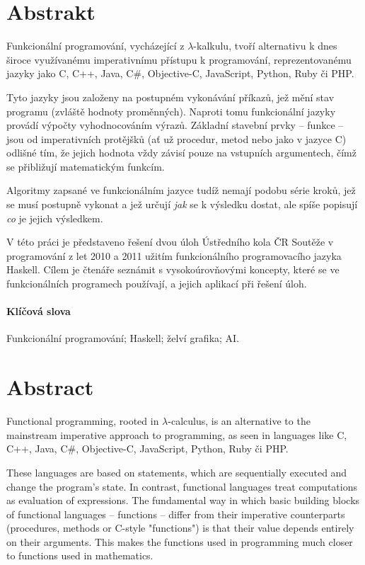 \begin{adjustwidth}{1.5cm}{1.5cm}

\section*{Abstrakt}

Funkcionální programování, vycházející z $\lambda$-kalkulu, tvoří alternativu k
dnes široce využívanému imperativnímu přístupu k programování, reprezentovanému
jazyky jako C, C++, Java, C\#, Objective-C, JavaScript, Python, Ruby či PHP.

Tyto jazyky jsou založeny na postupném vykonávání příkazů, jež mění stav
programu (zvláště hodnoty proměnných). Naproti tomu funkcionální jazyky provádí
výpočty vyhodnocováním výrazů. Základní stavební prvky -- funkce -- jsou od
imperativních protějšků (ať už procedur, metod nebo  jako v jazyce C)
odlišné tím, že jejich hodnota vždy závisí pouze na vstupních argumentech, čímž
se přibližují matematickým funkcím.

Algoritmy zapsané ve funkcionálním jazyce tudíž nemají podobu série kroků, jež
se musí postupně vykonat a jež určují \emph{jak} se k výsledku dostat, ale spíše
popisují \emph{co} je jejich výsledkem.

V této práci je představeno řešení dvou úloh Ústředního kola ČR Soutěže v
programování z let 2010 a 2011 užitím funkcionálního programovacího jazyka
Haskell. Cílem je čtenáře seznámit s vysokoúrovňovými koncepty, které se ve
funkcionálních programech používají, a jejich aplikací při řešení
 úloh.

\paragraph*{Klíčová slova}
Funkcionální programování; Haskell; želví grafika; AI.

\section*{Abstract}

Functional programming, rooted in $\lambda$-calculus, is an alternative to the
mainstream imperative approach to programming, as seen in languages like C, C++,
Java, C\#, Objective-C, JavaScript, Python, Ruby či PHP.

These languages are based on statements, which are sequentially executed and
change the program's state. In contrast, functional languages treat computations
as evaluation of expressions. The fundamental way in which basic building blocks of
functional languages -- functions -- differ from their imperative counterparts
(procedures, methods or C-style "functions") is that their value depends
entirely on their arguments. This makes the functions used in programming much
closer to functions used in mathematics.


\end{adjustwidth}
